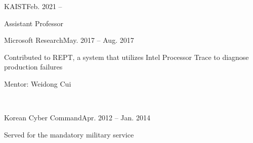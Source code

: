 \documentclass[11pt,letterpaper]{article}
\begin{document}
\begin{centry}{KAIST}{Feb. 2021 --}
\item Assistant Professor
\end{centry}
\begin{centry}{Microsoft Research}{May. 2017 -- Aug. 2017}
\item Contributed to REPT, a system that utilizes Intel Processor Trace to diagnose production failures
  \item Mentor:  Weidong Cui
\end{centry}
 \\
\begin{centry}{Korean Cyber Command}{Apr. 2012 -- Jan. 2014}
  \item Served for the mandatory military service
\end{centry}
\end{document}
